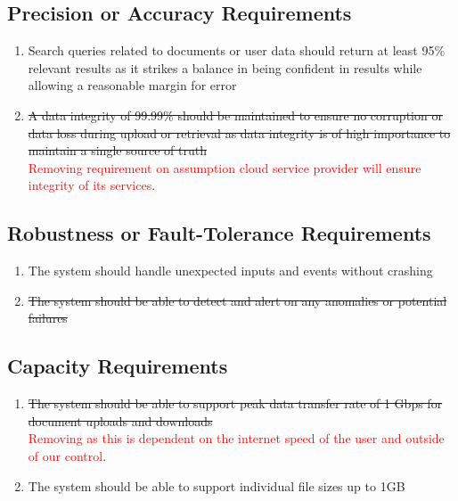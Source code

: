 \documentclass[12pt]{article}
\begin{document}
\subsection{Precision or Accuracy Requirements}
\begin{enumerate}[{PR-PA}1.]
  \item Search queries related to documents or user data should
    return at least 95\% relevant results as it strikes a balance in
    being confident in results
    while allowing a reasonable margin for error
  \item \sout{A data integrity of 99.99\% should be maintained to ensure no
      corruption or data loss during upload or retrieval as data
    integrity is of high importance to maintain a single source of truth}\\
    \textcolor{red}{Removing requirement on assumption cloud service
    provider will ensure integrity of its services}.
\end{enumerate}

\subsection{Robustness or Fault-Tolerance Requirements}
\begin{enumerate}[{PR-RFT}1.]
  \item The system should handle unexpected inputs and events without crashing
  \item \sout{The system should be able to detect and alert on any
    anomalies or potential failures}
\end{enumerate}

\subsection{Capacity Requirements}
\begin{enumerate}[{PR-CR}1.]
  \item \sout{The system should be able to support peak data transfer rate
    of 1 Gbps for document uploads and downloads}\\
    \textcolor{red}{Removing as this is dependent on the internet
    speed of the user and outside of our control}.
  \item The system should be able to support individual file sizes up to 1GB
\end{enumerate}
\end{document}

